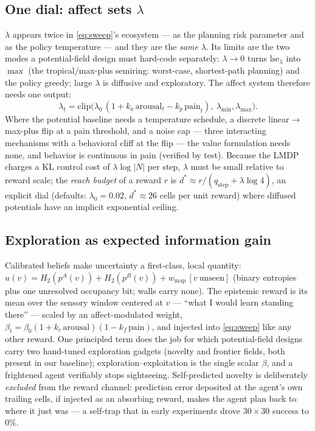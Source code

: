 \documentclass[11pt]{article}
\newcommand{\lse}{\mathrm{lse}}
\begin{document}
\subsection{One dial: affect sets $\lambda$}
\label{sec:lambda}
$\lambda$ appears twice in \cref{eq:sweep}'s ecosystem --- as the planning risk parameter and as the policy temperature --- and they are the \emph{same} $\lambda$. Its limits are the two modes a potential-field design must hard-code separately: $\lambda\to0$ turns $\lse_\lambda$ into $\max$ (the tropical/max-plus semiring: worst-case, shortest-path planning) and the policy greedy; large $\lambda$ is diffusive and exploratory. The affect system therefore needs one output:
\begin{equation}
\lambda_t = \mathrm{clip}\big(\lambda_0\,(1 + k_a\,\text{arousal}_t - k_p\,\text{pain}_t),\ \lambda_{\min},\lambda_{\max}\big).
\end{equation}
Where the potential baseline needs a temperature schedule, a discrete linear$\to$max-plus flip at a pain threshold, and a noise cap --- three interacting mechanisms with a behavioral cliff at the flip --- the value formulation needs none, and behavior is continuous in pain (verified by test). Because the LMDP charges a KL control cost of $\lambda\log|N|$ per step, $\lambda$ must be small relative to reward scale; the \emph{reach budget} of a reward $r$ is $d^\ast \approx r/(q_{\text{step}} + \lambda\log 4)$, an explicit dial (defaults: $\lambda_0{=}0.02$, $d^\ast\!\approx\!26$ cells per unit reward) where diffused potentials have an implicit exponential ceiling.

\subsection{Exploration as expected information gain}
\label{sec:infogain}
Calibrated beliefs make uncertainty a first-class, local quantity: $u(v) = H_2(p^A(v)) + H_2(p^B(v)) + w_{\text{map}}\,[v\ \text{unseen}]$ (binary entropies plus one unresolved occupancy bit; walls carry none). The epistemic reward is its mean over the sensory window centered at $v$ --- ``what I would learn standing there'' --- scaled by an affect-modulated weight, $\beta_t = \beta_0(1+k_c\,\text{arousal})(1-k_f\,\text{pain})$, and injected into \cref{eq:sweep} like any other reward. One principled term does the job for which potential-field designs carry two hand-tuned exploration gadgets (novelty and frontier fields, both present in our baseline); exploration--exploitation is the single scalar $\beta$, and a frightened agent verifiably stops sightseeing. Self-predicted novelty is deliberately \emph{excluded} from the reward channel: prediction error deposited at the agent's own trailing cells, if injected as an absorbing reward, makes the agent plan back to where it just was --- a self-trap that in early experiments drove $30{\times}30$ success to $0\%$.
\end{document}
